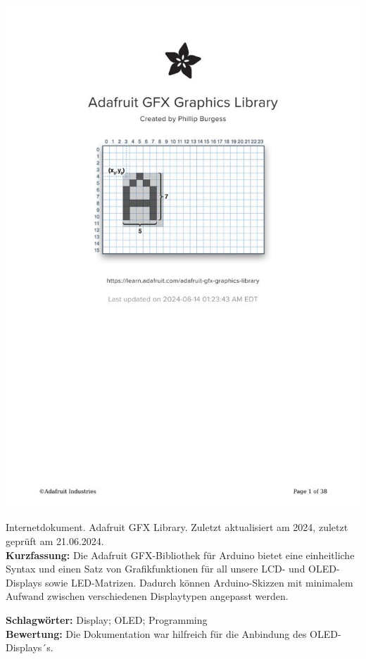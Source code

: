 %
%


{
	\begin{minipage}{0.38\textwidth}
		\includegraphics[width=\linewidth]{images/Adafruit.jpg}
	\end{minipage}
	\hfill
	\begin{minipage}{0.6\textwidth}
		Internetdokument. Adafruit GFX Library. Zuletzt aktualisiert am 2024, zuletzt geprüft am 21.06.2024.
		\\ \textbf{Kurzfassung:}
		Die Adafruit GFX-Bibliothek für Arduino bietet eine einheitliche Syntax und einen Satz von Grafikfunktionen für all unsere LCD- und OLED-Displays sowie LED-Matrizen. Dadurch können Arduino-Skizzen mit minimalem Aufwand zwischen verschiedenen Displaytypen angepasst werden.
	\end{minipage}
	\textbf{Schlagwörter:}
	Display; OLED; Programming
	\\ \textbf{Bewertung:}
	Die Dokumentation war hilfreich für die Anbindung des OLED-Displays´s.
}

